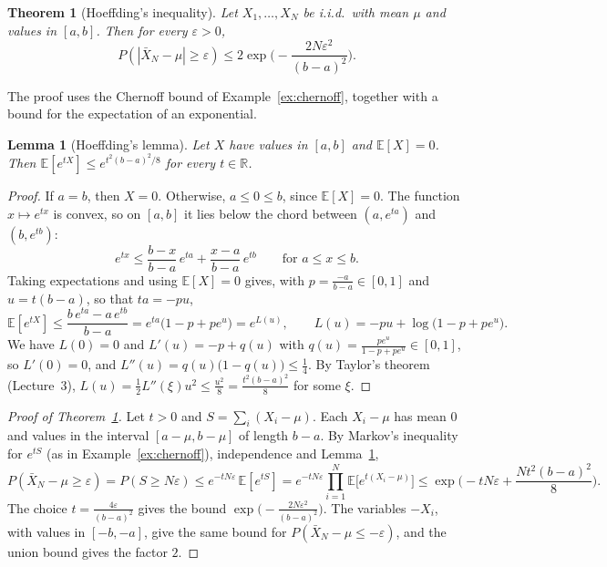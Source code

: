\documentclass[11pt]{article}
\newcommand{\E}{\mathbb{E}}
\theoremstyle{definition}
\theoremstyle{plain}
\newtheorem{theorem}[definition]{Theorem}
\newtheorem{lemma}[definition]{Lemma}
\theoremstyle{remark}
\begin{document}
\begin{theorem}[Hoeffding's inequality]\label{thm:hoeffding}
    Let $X_1, \ldots, X_N$ be i.i.d.\ with mean $\mu$ and values in $[a, b]$. Then for every $\varepsilon > 0$,
    \[P(|\bar X_N - \mu| \geq \varepsilon) \leq 2\exp\Big(-\frac{2N\varepsilon^2}{(b - a)^2}\Big).\]
\end{theorem}

The proof uses the Chernoff bound of Example~\ref{ex:chernoff}, together with a bound for the expectation of an exponential.

\begin{lemma}[Hoeffding's lemma]\label{lem:hoeffding}
    Let $X$ have values in $[a, b]$ and $\E[X] = 0$. Then $\E[e^{tX}] \leq e^{t^2(b - a)^2/8}$ for every $t \in \mathbb{R}$.
\end{lemma}

\begin{proof}
    If $a = b$, then $X = 0$. Otherwise, $a \leq 0 \leq b$, since $\E[X] = 0$. The function $x \mapsto e^{tx}$ is convex, so on $[a, b]$ it lies below the chord between $(a, e^{ta})$ and $(b, e^{tb})$:
    \[e^{tx} \leq \frac{b - x}{b - a}\,e^{ta} + \frac{x - a}{b - a}\,e^{tb} \qquad \text{for } a \leq x \leq b.\]
    Taking expectations and using $\E[X] = 0$ gives, with $p = \frac{-a}{b - a} \in [0, 1]$ and $u = t(b - a)$, so that $ta = -pu$,
    \[\E[e^{tX}] \leq \frac{b\,e^{ta} - a\,e^{tb}}{b - a} = e^{ta}\big(1 - p + pe^{u}\big) = e^{L(u)}, \qquad L(u) = -pu + \log\big(1 - p + pe^{u}\big).\]
    We have $L(0) = 0$ and $L'(u) = -p + q(u)$ with $q(u) = \frac{pe^u}{1 - p + pe^u} \in [0, 1]$, so $L'(0) = 0$, and $L''(u) = q(u)\big(1 - q(u)\big) \leq \frac{1}{4}$. By Taylor's theorem (Lecture~3), $L(u) = \frac{1}{2}L''(\xi)u^2 \leq \frac{u^2}{8} = \frac{t^2(b - a)^2}{8}$ for some $\xi$.
\end{proof}

\begin{proof}[Proof of Theorem~\ref{thm:hoeffding}]
    Let $t > 0$ and $S = \sum_i (X_i - \mu)$. Each $X_i - \mu$ has mean $0$ and values in the interval $[a - \mu, b - \mu]$ of length $b - a$. By Markov's inequality for $e^{tS}$ (as in Example~\ref{ex:chernoff}), independence and Lemma~\ref{lem:hoeffding},
    \[P(\bar X_N - \mu \geq \varepsilon) = P(S \geq N\varepsilon) \leq e^{-tN\varepsilon}\,\E[e^{tS}] = e^{-tN\varepsilon}\prod_{i=1}^N \E\big[e^{t(X_i - \mu)}\big] \leq \exp\Big(-tN\varepsilon + \frac{Nt^2(b - a)^2}{8}\Big).\]
    The choice $t = \frac{4\varepsilon}{(b - a)^2}$ gives the bound $\exp\big(-\frac{2N\varepsilon^2}{(b - a)^2}\big)$. The variables $-X_i$, with values in $[-b, -a]$, give the same bound for $P(\bar X_N - \mu \leq -\varepsilon)$, and the union bound gives the factor $2$.
\end{proof}
\end{document}
